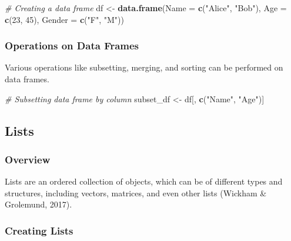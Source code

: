 \documentclass[
  b5paper]{book}
\newenvironment{Shaded}{\begin{snugshade}}{\end{snugshade}}
\newcommand{\AttributeTok}[1]{\textcolor[rgb]{0.13,0.29,0.53}{#1}}
\newcommand{\CommentTok}[1]{\textcolor[rgb]{0.56,0.35,0.01}{\textit{#1}}}
\newcommand{\DecValTok}[1]{\textcolor[rgb]{0.00,0.00,0.81}{#1}}
\newcommand{\FunctionTok}[1]{\textcolor[rgb]{0.13,0.29,0.53}{\textbf{#1}}}
\newcommand{\NormalTok}[1]{#1}
\newcommand{\OtherTok}[1]{\textcolor[rgb]{0.56,0.35,0.01}{#1}}
\newcommand{\StringTok}[1]{\textcolor[rgb]{0.31,0.60,0.02}{#1}}
\begin{document}
\begin{Shaded}
\begin{Highlighting}[]
\CommentTok{\# Creating a data frame}
\NormalTok{df }\OtherTok{\textless{}{-}} \FunctionTok{data.frame}\NormalTok{(}\AttributeTok{Name =} \FunctionTok{c}\NormalTok{(}\StringTok{"Alice"}\NormalTok{, }\StringTok{"Bob"}\NormalTok{), }\AttributeTok{Age =} \FunctionTok{c}\NormalTok{(}\DecValTok{23}\NormalTok{, }\DecValTok{45}\NormalTok{), }\AttributeTok{Gender =} \FunctionTok{c}\NormalTok{(}\StringTok{"F"}\NormalTok{, }\StringTok{"M"}\NormalTok{))}
\end{Highlighting}
\end{Shaded}

\hypertarget{operations-on-data-frames}{%
\subsubsection*{Operations on Data Frames}\label{operations-on-data-frames}}

Various operations like subsetting, merging, and sorting can be performed on data frames.

\begin{Shaded}
\begin{Highlighting}[]
\CommentTok{\# Subsetting data frame by column}
\NormalTok{subset\_df }\OtherTok{\textless{}{-}}\NormalTok{ df[, }\FunctionTok{c}\NormalTok{(}\StringTok{"Name"}\NormalTok{, }\StringTok{"Age"}\NormalTok{)]}
\end{Highlighting}
\end{Shaded}

\hypertarget{lists}{%
\subsection*{Lists}\label{lists}}

\hypertarget{overview-5}{%
\subsubsection*{Overview}\label{overview-5}}

Lists are an ordered collection of objects, which can be of different types and structures, including vectors, matrices, and even other lists (Wickham \& Grolemund, 2017).

\hypertarget{creating-lists}{%
\subsubsection*{Creating Lists}\label{creating-lists}}
\end{document}
